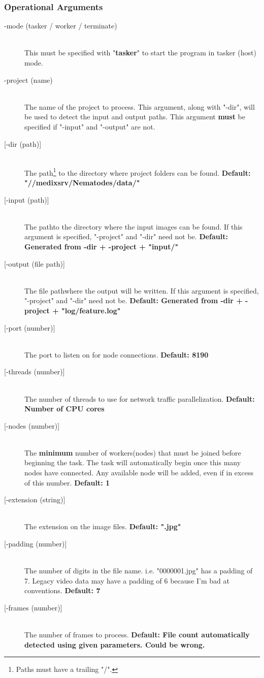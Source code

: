 \documentclass[]{article}
\begin{document}
\subsubsection{Operational Arguments}
\begin{description}
	\item[-mode (tasker / worker / terminate)] \hfill \\
	This must be specified with "\textbf{tasker}" to start the program in tasker (host) mode.
	\item[-project (name)] \hfill \\
	The name of the project to process. This argument, along with "-dir", will be used to detect the input and output paths. This argument \textbf{must} be specified if "-input" and "-output" are not.
	\item[{[-dir (path)]}] \hfill \\
	The path\footnote{\label{pathnote}Paths must have a trailing "/".} to the directory where project folders can be found. \textbf{Default: "//medixsrv/Nematodes/data/"}
	\item[{[-input (path)]}] \hfill \\
	The path\footnotemark[\ref{pathnote}] to the directory where the input images can be found. If this argument is specified, "-project" and "-dir" need not be. \textbf{Default: Generated from -dir + -project + "input/"}
	\item[{[-output (file path)]}] \hfill \\
	The file path\footnotemark[\ref{pathnote}] where the output will be written. If this argument is specified, "-project" and "-dir" need not be. \textbf{Default: Generated from -dir + -project + "log/feature.log"}
	\item[{[-port (number)]}] \hfill \\
	The port to listen on for node connections. \textbf{Default: 8190}
	\item[{[-threads (number)]}] \hfill \\
	The number of threads to use for network traffic parallelization. \textbf{Default: Number of CPU cores}
	\item[{[-nodes (number)]}] \hfill \\
	The \textbf{minimum} number of workers(nodes) that must be joined before beginning the task. The task will automatically begin once this many nodes have connected. Any available node will be added, even if in excess of this number. \textbf{Default: 1}
	\item[{[-extension (string)]}] \hfill \\
	The extension on the image files. \textbf{Default: ".jpg"}
	\item[{[-padding (number)]}] \hfill \\
	The number of digits in the file name. i.e. "0000001.jpg" has a padding of 7. Legacy video data may have a padding of 6 because I'm bad at conventions. \textbf{Default: 7}
	\item[{[-frames (number)]}] \hfill \\
	The number of frames to process.  \textbf{Default: File count automatically detected using given parameters. Could be wrong.}
\end{description}
\end{document}
